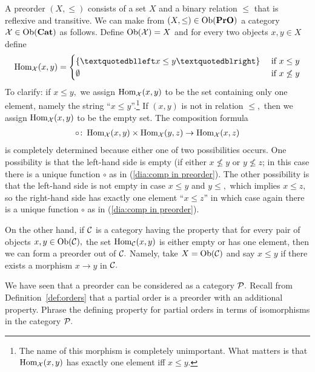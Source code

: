 \documentclass[../main/CT4S-EN-RU]{subfiles}
\begin{document}
\begin{blockENG}
A preorder $(X,\leq)$ consists of a set $X$ and a binary relation $\leq$ that is reflexive and transitive. We can make from $(X,\leq)\in\operatorname{Ob}({\mathbf{PrO}})$ a category $\mathcal{X}\in\operatorname{Ob}({\mathbf{Cat}})$ as follows. Define $\operatorname{Ob}(\mathcal{X})=X$ and for every two objects $x,y\in X$ define
$$\Hom_\mcX(x,y)=\begin{cases}\{“x\leq y”\}&\tn{ if } x\leq y\\\emptyset&\tn{ if } x\not\leq y\end{cases}$$
To clarify: if $x\leq y,$ we assign $\operatorname{Hom}_\mathcal{X}(x,y)$ to be the set containing only one element, namely the string “$x\leq y$”.\footnote{The name of this morphism is completely unimportant. What matters is that $\operatorname{Hom}_\mathcal{X}(x,y)$ has exactly one element iff $x\leq y.$} If $(x,y)$ is not in relation $\leq,$ then we assign $\operatorname{Hom}_\mathcal{X}(x,y)$ to be the empty set. The composition formula 
\begin{align}\label{dia:comp in preorder}
\circ\colon\operatorname{Hom}_\mathcal{X}(x,y)\times\operatorname{Hom}_\mathcal{X}(y,z)\rightarrow\operatorname{Hom}_\mathcal{X}(x,z)
\end{align}
is completely determined because either one of two possibilities occurs. One possibility is that the left-hand side is empty (if either $x\not\leq y$ or $y\not\leq z$; in this case there is a unique function $\circ$ as in (\ref{dia:comp in preorder}). The other possibility is that the left-hand side is not empty in case $x\leq y$ and $y\leq,$ which implies $x\leq z,$ so the right-hand side has exactly one element $“x\leq z”$ in which case again there is a unique function $\circ$ as in (\ref{dia:comp in preorder}).
\end{blockENG}

\begin{blockRUS}
\end{blockRUS}

\begin{blockENG}
On the other hand, if $\mathcal{C}$ is a category having the property that for every pair of objects $x,y\in\operatorname{Ob}(\mathcal{C}),$ the set $\operatorname{Hom}_\mathcal{C}(x,y)$ is either empty or has one element, then we can form a preorder out of $\mathcal{C}.$ Namely, take $X=\operatorname{Ob}(\mathcal{C})$ and say $x\leq y$ if there exists a morphism $x\to y$ in $\mathcal{C}.$ 
\end{blockENG}

\begin{blockRUS}
\end{blockRUS}

\begin{exerciseENG}
We have seen that a preorder can be considered as a category $\mathcal{P}.$ Recall from Definition~\ref{def:orders} that a partial order is a preorder with an additional property. Phrase the defining property for partial orders in terms of isomorphisms in the category $\mathcal{P}.$
\end{exerciseENG}
\end{document}

